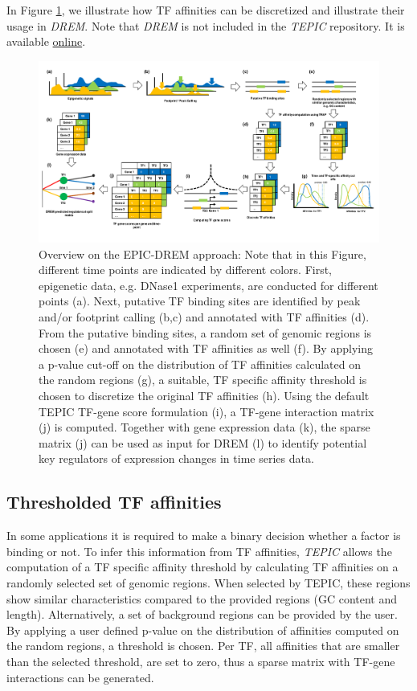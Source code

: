 \documentclass{article}
\begin{document}
In Figure \ref{epicdrem}, we illustrate how TF affinities can be discretized and illustrate their usage in \textit{DREM}. Note that \textit{DREM}
is not included in the \textit{TEPIC} repository. It is available \href{http://www.sb.cs.cmu.edu/drem/}{online}.
\begin{figure}[h!]
\begin{center}
\includegraphics[width=\textwidth]{epicdrem.pdf}
\end{center}
\caption{Overview on the EPIC-DREM approach: Note that in this Figure, different time points are indicated by different colors. First, epigenetic data, e.g. DNase1 experiments, are conducted for different points (a).
Next, putative TF binding sites are identified by peak and/or footprint calling (b,c) and annotated with TF affinities (d). 
From the putative binding sites, a random set of genomic regions is chosen (e) and annotated with TF affinities as well (f). By applying a p-value cut-off on the distribution of TF affinities calculated on the random regions (g),
a suitable, TF specific affinity threshold is chosen to discretize the original TF affinities (h). Using the default TEPIC TF-gene score formulation (i), a TF-gene interaction matrix (j) is computed. Together with gene expression data (k),
the sparse matrix (j) can be used as input for DREM (l) to identify potential key regulators of expression changes in time series data.}
\label{epicdrem}
\end{figure}

\subsection{Thresholded TF affinities}
In some applications it is required to make a binary decision whether a factor is binding or not. 
To infer this information from TF affinities, \textit{TEPIC} allows the computation of a TF specific affinity threshold by calculating TF affinities on a randomly selected set of genomic regions. When selected by TEPIC, these regions show similar characteristics compared to the provided regions (GC content and length). 
Alternatively, a set of background regions can be provided by the user.
By applying a user defined p-value on the distribution of affinities computed on the random regions, a threshold is chosen. 
Per TF, all affinities that are smaller than the selected threshold, are set to zero, thus a sparse matrix with TF-gene interactions can be generated. 
\end{document}
